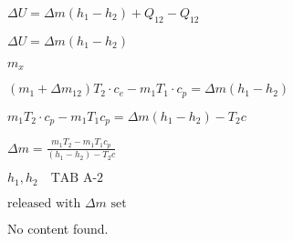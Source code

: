 \( \Delta U = \Delta m (h_1 - h_2) + Q_{12} - Q_{12} \)  

\( \Delta U = \Delta m (h_1 - h_2) \)  

\( m_x \)  

\( (m_1 + \Delta m_{12}) T_2 \cdot c_e - m_1 T_1 \cdot c_p = \Delta m (h_1 - h_2) \)  

\( m_1 T_2 \cdot c_p - m_1 T_1 c_p = \Delta m (h_1 - h_2) - T_2 c \)  

\( \Delta m = \frac{m_1 T_2 - m_1 T_1 c_p}{(h_1 - h_2) - T_2 c} \)  

\( h_1, h_2 \quad \text{TAB A-2} \)  

\( \text{released with } \Delta m \text{ set} \)

No content found.